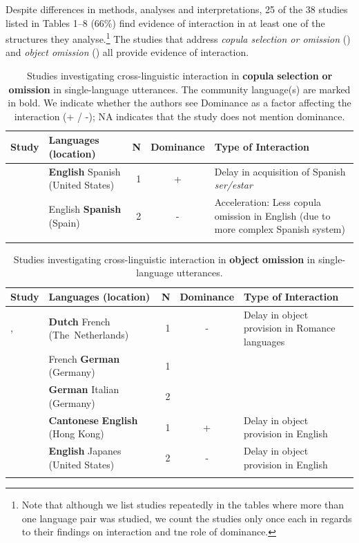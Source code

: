 \documentclass[output=paper]{langscibook}
\begin{document}
Despite differences in methods, analyses and interpretations, 25 of the 38 studies listed in Tables 1–8 (66\%) find evidence of interaction in at least one of the structures they analyse.\footnote{Note that although we list studies repeatedly in the tables where more than one language pair was studied, we count the studies only once each in regards to their findings on interaction and tne role of dominance.} The studies that address \textit{copula selection or omission} () and \textit{object omission} () all provide evidence of interaction.


\begin{table}
\begin{tabularx}{\textwidth}{QQ@{}rcQ}
\lsptoprule
{ Study} & { Languages}   (location)& { N}  & { Dominance} & { Type of Interaction}\\
\midrule
\citet{Silva-corvalan2008} & \textbf{English} Spanish (United States) & 1 & + & Delay in acquisition of Spanish \textit{ser/estar} \\
\tablevspace
\citet{FernándezFuertesLiceras2010,LicerasEtAl2012} & English \textbf{Spanish} (Spain) & 2 & - & Acceleration:  Less copula omission in English (due to more complex Spanish system)\\
\lspbottomrule
\end{tabularx}
\caption{Studies investigating cross-linguistic interaction in \textbf{copula} \textbf{selection} \textbf{or} \textbf{omission} in single-language utterances. The community language(s) are marked in bold. We indicate whether the authors see Dominance as a factor affecting the interaction (+ / -); NA indicates that the study does not mention dominance.}
\label{tab:vihmannvihmann:1}
\end{table}


\begin{table}
\begin{tabularx}{\textwidth}{QQrcQ}
\lsptoprule
{ Study} & { Languages}  { (location)} & { N}  & { Dominance} & { Type of Interaction}\\
\midrule
\citet{HulkMüller2000}, \citet{Muller2001} & \textbf{Dutch} French \mbox{(The Netherlands)} & 1 & - & Delay in object provision in Romance languages \\
& French \textbf{German} (Germany) & 1 &  & \\
& \textbf{German} Italian (Germany) & 2 &  & \\
\tablevspace
\citet{YipMatthews2000} & \textbf{Cantonese} \textbf{English} (Hong Kong) & 1 & + & Delay in object provision in English\\
\tablevspace
\citet{Mishina-Mori2020} & \textbf{English} Japanes (United States) & 2 & - & Delay in object provision in English\\
\lspbottomrule
\end{tabularx}
\caption{Studies investigating cross-linguistic interaction in \textbf{object} \textbf{omission} in single-language utterances.}
\label{tab:vihmannvihmann:2}
\end{table}
\end{document}

